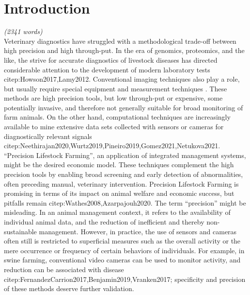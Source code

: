 \documentclass[10pt,a4paper]{article}
\begin{document}
\section{Introduction}
\label{intro}
\emph{(2341 words)\\\empty
}
Veterinary diagnostics have struggled with a methodological trade-off between high precision and high through-put.
In the era of genomics, proteomics, and the like, the strive for accurate diagnostics of livestock diseases has directed considerable attention to the development of modern laboratory tests citep:Howson2017,Lamy2012.
Conventional imaging techniques also play a role, but usually require special equipment and measurement techniques \citep[e.g. radiography, microscopy, ultrasound, \textit{cf.}][]{Yitbarek2022}.
These methods are high precision tools, but low through-put or expensive, some potentially invasive, and therefore not generally suitable for broad monitoring of farm animals.
On the other hand, computational techniques are increasingly available to mine extensive data sets collected with sensors or cameras for diagnostically relevant signals citep:Neethirajan2020,Wurtz2019,Pineiro2019,Gomez2021,Netukova2021.
``Precision Lifestock Farming'', an application of integrated management systems, might be the desired economic model.
These techniques complement the high precision tools by enabling broad screening and early detection of abnormalities, often preceding manual, veterinary intervention.
Precision Lifestock Farming is promising in terms of its impact on animal welfare and economic success, but pitfalls remain citep:Wathes2008,Azarpajouh2020.
The term ``precision'' might be misleading.
In an animal management context, it refers to the availability of individual animal data, and the reduction of inefficient and thereby non-sustainable management.
However, in practice, the use of sensors and cameras often still is restricted to superficial measures such as the overall activity or the mere occurrence or frequency of certain behaviors of individuals.
For example, in swine farming, conventional video cameras can be used to monitor activity, and reduction can be associated with disease citep:FernandezCarrion2017,Benjamin2019,Vranken2017; specificity and precision of these methods deserve further validation.
\end{document}
